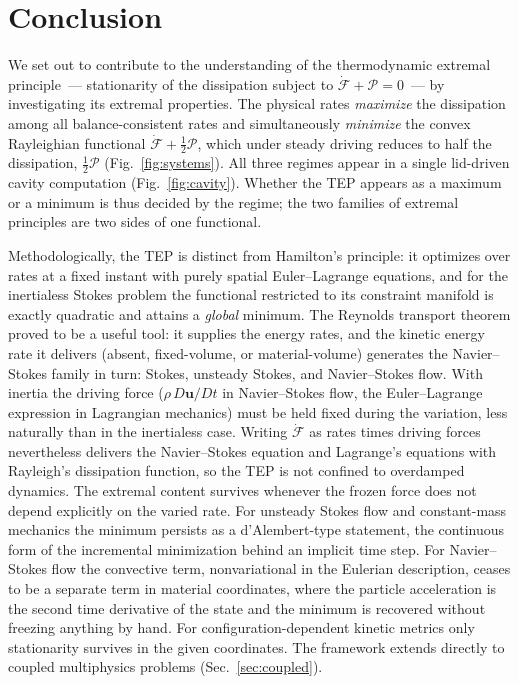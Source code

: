 \documentclass[aip,pof,reprint,amsmath,amssymb,longbibliography]{revtex4-2}
\begin{document}
\section{Conclusion}

We set out to contribute to the understanding of the thermodynamic extremal principle~--- stationarity of the dissipation subject to $\dot{\mathcal{F}} + \mathcal{P} = 0$~--- by investigating its extremal properties. The physical rates \textit{maximize} the dissipation among all balance-consistent rates and simultaneously \textit{minimize} the convex Rayleighian functional $\dot{\mathcal{F}} + \tfrac{1}{2}\mathcal{P}$, which under steady driving reduces to half the dissipation, $\tfrac{1}{2}\mathcal{P}$ (Fig.~\ref{fig:systems}). All three regimes appear in a single lid-driven cavity computation (Fig.~\ref{fig:cavity}). Whether the TEP appears as a maximum or a minimum is thus decided by the regime; the two families of extremal principles are two sides of one functional.

Methodologically, the TEP is distinct from Hamilton's principle: it optimizes over rates at a fixed instant with purely spatial Euler--Lagrange equations, and for the inertialess Stokes problem the functional restricted to its constraint manifold is exactly quadratic and attains a \textit{global} minimum. The Reynolds transport theorem proved to be a useful tool: it supplies the energy rates, and the kinetic energy rate it delivers (absent, fixed-volume, or material-volume) generates the Navier--Stokes family in turn: Stokes, unsteady Stokes, and Navier--Stokes flow. With inertia the driving force ($\rho\, D\boldsymbol{u}/Dt$ in Navier--Stokes flow, the Euler--Lagrange expression in Lagrangian mechanics) must be held fixed during the variation, less naturally than in the inertialess case. Writing $\dot{\mathcal{F}}$ as rates times driving forces nevertheless delivers the Navier--Stokes equation and Lagrange's equations with Rayleigh's dissipation function, so the TEP is not confined to overdamped dynamics. The extremal content survives whenever the frozen force does not depend explicitly on the varied rate. For unsteady Stokes flow and constant-mass mechanics the minimum persists as a d'Alembert-type statement, the continuous form of the incremental minimization behind an implicit time step. For Navier--Stokes flow the convective term, nonvariational in the Eulerian description, ceases to be a separate term in material coordinates, where the particle acceleration is the second time derivative of the state and the minimum is recovered without freezing anything by hand. For configuration-dependent kinetic metrics only stationarity survives in the given coordinates. The framework extends directly to coupled multiphysics problems (Sec.~\ref{sec:coupled}).
\end{document}
